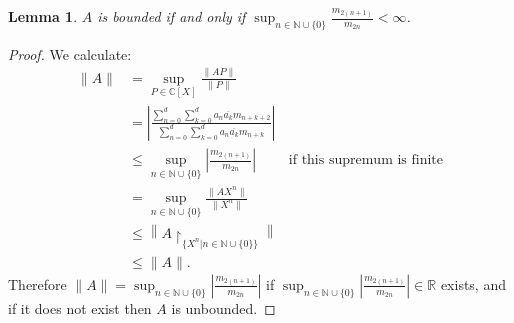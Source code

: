 \documentclass[12pt,oneside]{report}
\newtheorem{lem}[thm]{Lemma}
\begin{document}
\begin{lem}\label{A-bound}
    $A$ is bounded if and only if $\sup_{n \in \mathbb{N} \cup \{ 0 \}}\frac{m_{2(n+1)}}{m_{2n}} < \infty$.
\end{lem}
\begin{proof}
    We calculate:
    \begin{align*}
        \|A\| &= \sup_{P \in \mathbb{C}[X]} \frac{\|AP\|}{\|P\|} \\
        &= \left|\frac{\sum_{n=0}^{d}\sum_{k=0}^{d}a_{n}\overline{a_{k}}m_{n+k+2}}{\sum_{n=0}^{d}\sum_{k=0}^{d}a_{n}\overline{a_{k}}m_{n+k}}\right| \\
        &\leq \sup_{n \in \mathbb{N} \cup \{ 0 \}} \left|\frac{m_{2(n+1)}}{m_{2n}}\right| & \text{if this supremum is finite} \\
        &= \sup_{n \in \mathbb{N} \cup \{ 0 \}} \frac{\|AX^{n}\|}{\|X^{n}\|} \\
        &\leq \left\|A\restriction_{\{ X^{n} | n \in \mathbb{N} \cup \{ 0 \} \}}\right\| \\
        &\leq \|A\|.
    \end{align*}
    Therefore $\|A\| = \sup_{n \in \mathbb{N} \cup \{ 0 \}} \left|\frac{m_{2(n+1)}}{m_{2n}}\right|$ if $\sup_{n \in \mathbb{N} \cup \{ 0 \}} \left|\frac{m_{2(n+1)}}{m_{2n}}\right| \in \mathbb{R}$ exists, and if it does not exist then $A$ is unbounded.
\end{proof}

\end{document}
